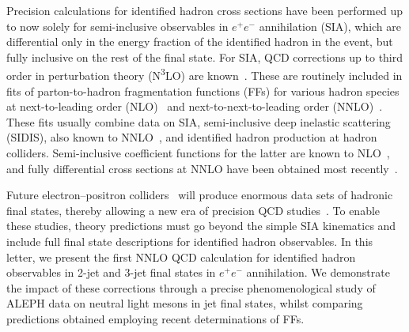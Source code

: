 \documentclass[10pt,aps,prl,twocolumn,preprintnumbers,nofootinbib]{revtex4-2}
\begin{document}
Precision calculations for identified hadron cross sections have been performed up to now solely for semi-inclusive observables in $e^+e^-$ annihilation (SIA), which are differential only in the energy fraction of the identified hadron in the event, but fully inclusive on the rest of the final state.
For SIA, QCD corrections up to third order in perturbation theory (N\textsuperscript{3}LO) are known~\cite{Altarelli:1979kv,Rijken:1996vr,Rijken:1996ns,Mitov:2006ic,He:2025hin}.
These are routinely included in fits of parton-to-hadron fragmentation functions (FFs) for various hadron species at next-to-leading order (NLO)~\cite{Binnewies:1994ju,Binnewies:1995pt,Kniehl:2000fe,Bourhis:2000gs,Kretzer:2000yf,Kretzer:2001pz,deFlorian:2007ekg,deFlorian:2014xna,deFlorian:2017lwf,Borsa:2021ran,Hirai:2007cx,Albino:2008fy,Bertone:2018ecm,Khalek:2021gxf,Moffat:2021dji,Gao:2024dbv,Gao:2024nkz,Gao:2025bko} and next-to-next-to-leading order (NNLO)~\cite{Bertone:2017tyb,Anderle:2015lqa,Abdolmaleki:2021yjf,Borsa:2022vvp,Gao:2025hlm,AbdulKhalek:2022laj,Li:2024etc}.
These fits usually combine data on SIA, semi-inclusive deep inelastic scattering (SIDIS), also known to NNLO~\cite{Altarelli:1979kv,deFlorian:1997zj,Bonino:2024qbh,Goyal:2023zdi}, and identified hadron production at hadron colliders.
Semi-inclusive coefficient functions for the latter are known to NLO~\cite{Aversa:1988vb,Jager:2002xm}, and fully differential cross sections at NNLO have been obtained most recently~\cite{Czakon:2025yti,Generet:2025bqx}.

Future electron--positron colliders~\cite{FCC:2025lpp} will produce enormous data sets of hadronic final states, thereby allowing a new era of precision QCD studies~\cite{Zhou:2024cyk,dEnterria:2025pml}.
To enable these studies, theory predictions must go beyond the simple SIA kinematics and include full final state descriptions for identified hadron observables.
In this letter, we present the first NNLO QCD calculation for identified hadron observables in 2-jet and 3-jet final states in $e^+e^-$ annihilation.
We demonstrate the impact of these corrections through a precise phenomenological study of ALEPH data on neutral light mesons in jet final states, whilst comparing predictions obtained employing recent determinations of FFs.
\newline
\end{document}

